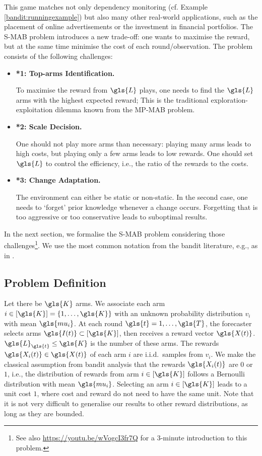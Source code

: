 This game matches not only dependency monitoring (cf. Example \ref{bandit:runningexample}) but also many other real-world applications, such as the placement of online advertisements or the investment in financial portfolios. The \gls{S-MAB} problem introduces a new trade-off: one wants to maximise the reward, but at the same time minimise the cost of each round/observation. The problem consists of the following challenges: 

\begin{itemize}[noitemsep]
	\item \hypertarget{*1}{\textbf{*1: Top-arms Identification.}} To maximise the reward from $\gls{L}$ plays, one needs to find the $\gls{L}$ arms with the highest expected reward; This is the traditional exploration-exploitation dilemma known from the \gls{MP-MAB} problem.
	
	\item \hypertarget{*2}{\textbf{*2: Scale Decision.}} One should not play more arms than necessary: playing many arms leads to high costs, but playing only a few arms leads to low rewards. One should set $\gls{L}$ to control the efficiency, i.e., the ratio of the rewards to the costs.
	
	\item \hypertarget{*3}{\textbf{*3: Change Adaptation.}} The environment can either be static or non-static. In the second case, one needs to `forget' prior knowledge whenever a change occurs. Forgetting that is too aggressive or too conservative leads to suboptimal results.
\end{itemize}
In the next section, we formalise the \gls{S-MAB} problem considering those challenges\footnote{See also \url{https://youtu.be/wVogcI3fr7Q} for a 3-minute introduction to this problem.}. We use the most common notation from the bandit literature, e.g., as in \cite{DBLP:journals/ftml/BubeckC12}. 

\subsection{Problem Definition}
\label{section:notationsbandits}

Let there be $\gls{K}$ arms. We associate each arm $i \in [\gls{K}]  = \left\{1,\dots,\gls{K}\right\}$ with an unknown probability distribution $v_i$ with mean $\gls{mu_i}$. 
At each round $\gls{t} = 1, \dots, \gls{T}$, the forecaster selects arms $\gls{I(t)} \subset [\gls{K}]$, then receives a reward vector $\gls{X(t)}$. 
$\gls{L}_{\gls{t}} \le \gls{K}$ is the number of these arms.
The rewards $\gls{X_i(t)} \in \gls{X(t)}$ of each arm $i$ are i.i.d.\ samples from $v_i$. We make the classical assumption from bandit analysis that the rewards $\gls{X_i(t)}$ are $0$ or $1$, i.e., the distribution of rewards from arm $i \in [\gls{K}]$ follows a Bernoulli distribution with mean $\gls{mu_i}$. 
Selecting an arm $i \in [\gls{K}]$ leads to a unit cost $1$, where cost and reward do not need to have the same unit. Note that it is not very difficult to generalise our results to other reward distributions, as long as they are bounded. 

